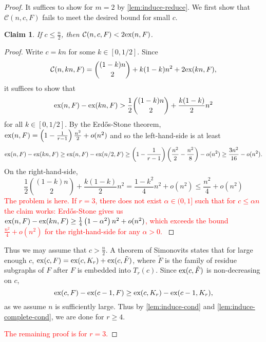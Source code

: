 \documentclass[12pt]{report}
\newtheorem{claim}{Claim}[theorem]
\newcommand*{\ex}{\textnormal{ex}}
\newcommand*{\con}{\mathcal{C}}
\begin{document}
\begin{proof}
  It suffices to show for $m = 2$ by \cref{lem:induce-reduce}. We first show that $\con(n, c, F)$ fails to meet the desired bound for small $c$.
  \begin{claim}
    If $c \leq \frac{n}{2}$, then $\con(n, c, F) < 2\ex(n, F)$.
  \end{claim}

  \begin{proof}
    Write $c = kn$ for some $k \in [0, 1/2]$. Since
    \[
      \con(n, kn, F) = \binom{(1 - k)n}{2} + k(1 - k)n^2 + 2\ex(kn, F),
    \]
    it suffices to show that
    \[
      \ex(n, F) - \ex(kn, F) > \frac{1}{2}\binom{(1 - k)n}{2} + \frac{k(1 - k)}{2}n^2
    \]
    for all $k \in [0, 1/2]$. By the Erdős-Stone theorem, $\ex(n, F) = \left(1 - \frac{1}{r - 1}\right)\frac{n^2}{2} + o(n^2)$ and so the left-hand-side is at least
    \[
      \ex(n, F) - \ex(kn, F) \geq \ex(n, F) - \ex(n/2, F) \geq \left(1 - \frac{1}{r - 1}\right)\left(\frac{n^2}{2} - \frac{n^2}{8}\right) - o(n^2) \geq \frac{3n^2}{16} - o(n^2).
    \]
    On the right-hand-side, 
    \[
      \frac{1}{2}\binom{(1 - k)n}{2} + \frac{k(1 - k)}{2}n^2 = \frac{1 - k^2}{4}n^2 + o(n^2) \leq \frac{n^2}{4} + o(n^2)
    \]
    \textcolor{red}{The problem is here. If $r = 3$, there does not exist $\alpha \in (0, 1]$ such that for $c \leq \alpha n$ the claim works: Erdős-Stone gives us $\ex(n, F) - \ex(kn, F) \geq \frac{1}{4}\left(1 - \alpha^2\right)n^2 + o(n^2)$, which exceeds the bound $\frac{n^2}{4} + o(n^2)$ for the right-hand-side for any $\alpha > 0$. }
  \end{proof}

  Thus we may assume that $c > \frac{n}{2}$. A theorem of Simonovits states that for large enough $c$, $\ex(c, F) = \ex(c, K_{r}) + \ex(c, \tilde{F})$, where $\tilde{F}$ is the family of residue subgraphs of $F$ after $F$ is embedded into $T_r(c)$. Since $\ex(c, \tilde{F})$ is non-decreasing on $c$,
  \[
    \ex(c, F) - \ex(c - 1, F) \geq \ex(c, K_{r}) - \ex(c - 1, K_{r}),
  \]
  as we assume $n$ is sufficiently large. Thus by \cref{lem:induce-cond} and \cref{lem:induce-complete-cond}, we are done for $r \geq 4$. 

  \textcolor{red}{The remaining proof is for $r = 3$.}
  

\end{proof}
\end{document}
